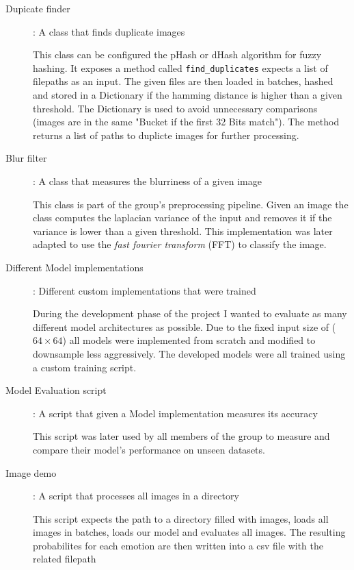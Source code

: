 \begin{description}
  \item [Dupicate finder]: A class that finds duplicate images

    This class can be configured the pHash or dHash algorithm for fuzzy hashing. It exposes 
    a method called \texttt{find\_duplicates} expects a list of filepaths as an input. The 
    given files are then loaded in batches, hashed and stored in a Dictionary if the hamming
    distance is higher than a given threshold. The Dictionary is used to avoid unnecessary 
    comparisons (images are in the same "Bucket if the first 32 Bits match"). The method returns 
    a list of paths to duplicte images for further processing.

  \item [Blur filter]: A class that measures the blurriness of a given image

    This class is part of the group's preprocessing pipeline. Given an image the class computes
    the laplacian variance of the input and removes it if the variance is lower than a given threshold. 
    This implementation was later adapted to use the \textit{fast fourier transform} (FFT) to classify the 
    image.

  \item [Different Model implementations]: Different custom implementations that were trained

    During the development phase of the project I wanted to evaluate as many different model architectures 
    as possible. Due to the fixed input size of ($64 \times 64$) all models were implemented from scratch 
    and modified to downsample less aggressively. The developed models were all trained using a custom training 
    script.

  \item [Model Evaluation script]: A script that given a Model implementation measures its accuracy

    This script was later used by all members of the group to measure and compare their model's performance on 
    unseen datasets.
  
  \item [Image demo]: A script that processes all images in a directory

    This script expects the path to a directory filled with images, loads all images in batches,
    loads our model and evaluates all images. The resulting probabilites for each emotion are then
    written into a csv file with the related filepath


\end{description}
